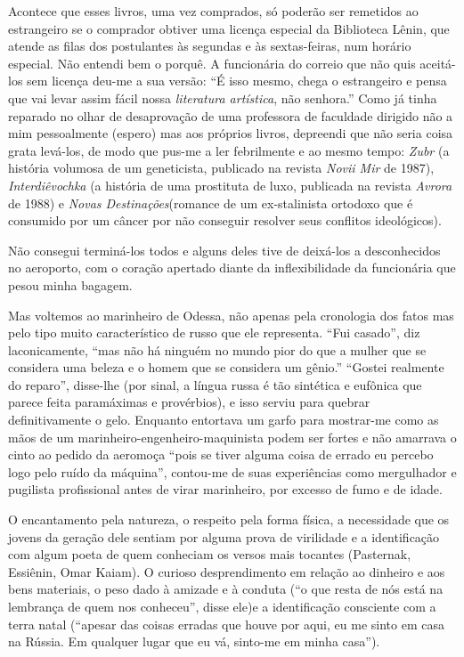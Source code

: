 Acontece que esses livros, uma vez comprados, só poderão ser remetidos
ao estrangeiro se o comprador obtiver uma licença especial da Biblioteca
Lênin, que atende as filas dos postulantes às segundas e às
sextas-feiras, num horário especial. Não entendi bem o porquê. A
funcionária do correio que não quis aceitá-los sem licença deu-me a sua
versão: ``É isso mesmo, chega o estrangeiro e pensa que vai levar assim
fácil nossa \emph{literatura artística}, não senhora.'' Como já tinha
reparado no olhar de desaprovação de uma professora de faculdade
dirigido não a mim pessoalmente (espero) mas aos próprios livros,
depreendi que não seria coisa grata levá-los, de modo que pus-me a ler
febrilmente e ao mesmo tempo: \emph{Zubr} (a história volumosa de um
geneticista, publicado na revista \emph{Novii Mir} de 1987),
\emph{Interdiêvochka} (a história de uma prostituta de luxo, publicada
na revista \emph{Avrora} de 1988) e \emph{Novas Destinações}(romance de
um ex-stalinista ortodoxo que é consumido por um câncer por não
conseguir resolver seus conflitos ideológicos).

Não consegui terminá-los todos e alguns deles tive de deixá-los a
desconhecidos no aeroporto, com o coração apertado diante da
inflexibilidade da funcionária que pesou minha bagagem.

Mas voltemos ao marinheiro de Odessa, não apenas pela cronologia dos
fatos mas pelo tipo muito característico de russo que ele representa.
``Fui casado'', diz laconicamente, ``mas não há ninguém no mundo pior do
que a mulher que se considera uma beleza e o homem que se considera um
gênio.'' ``Gostei realmente do reparo'', disse-lhe (por sinal, a língua
russa é tão sintética e eufônica que parece feita paramáximas e
provérbios), e isso serviu para quebrar definitivamente o gelo. Enquanto
entortava um garfo para mostrar-me como as mãos de um
marinheiro-engenheiro-maquinista podem ser fortes e não amarrava o cinto
ao pedido da aeromoça ``pois se tiver alguma coisa de errado eu percebo
logo pelo ruído da máquina'', contou-me de suas experiências como
mergulhador e pugilista profissional antes de virar marinheiro, por
excesso de fumo e de idade.

O encantamento pela natureza, o respeito pela forma física, a
necessidade que os jovens da geração dele sentiam por alguma prova de
virilidade e a identificação com algum poeta de quem conheciam os versos
mais tocantes (Pasternak, Essiênin, Omar Kaiam). O curioso
desprendimento em relação ao dinheiro e aos bens materiais, o peso dado
à amizade e à conduta (``o que resta de nós está na lembrança de quem
nos conheceu'', disse ele)e a identificação consciente com a terra natal
(``apesar das coisas erradas que houve por aqui, eu me sinto em casa na
Rússia. Em qualquer lugar que eu vá, sinto-me em minha casa'').

